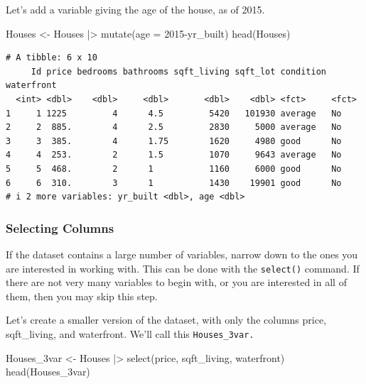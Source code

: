 \documentclass[
  letterpaper,
  DIV=11,
  numbers=noendperiod]{scrreprt}
\newenvironment{Shaded}{\begin{snugshade}}{\end{snugshade}}
\newcommand{\AttributeTok}[1]{\textcolor[rgb]{0.40,0.45,0.13}{#1}}
\newcommand{\DecValTok}[1]{\textcolor[rgb]{0.68,0.00,0.00}{#1}}
\newcommand{\FunctionTok}[1]{\textcolor[rgb]{0.28,0.35,0.67}{#1}}
\newcommand{\NormalTok}[1]{\textcolor[rgb]{0.00,0.23,0.31}{#1}}
\newcommand{\OtherTok}[1]{\textcolor[rgb]{0.00,0.23,0.31}{#1}}
\newcommand{\SpecialCharTok}[1]{\textcolor[rgb]{0.37,0.37,0.37}{#1}}
\begin{document}
Let's add a variable giving the age of the house, as of 2015.

\begin{Shaded}
\begin{Highlighting}[]
\NormalTok{Houses }\OtherTok{\textless{}{-}}\NormalTok{ Houses }\SpecialCharTok{|\textgreater{}} \FunctionTok{mutate}\NormalTok{(}\AttributeTok{age =} \DecValTok{2015}\SpecialCharTok{{-}}\NormalTok{yr\_built)}
\FunctionTok{head}\NormalTok{(Houses)}
\end{Highlighting}
\end{Shaded}

\begin{verbatim}
# A tibble: 6 x 10
     Id price bedrooms bathrooms sqft_living sqft_lot condition waterfront
  <int> <dbl>    <dbl>     <dbl>       <dbl>    <dbl> <fct>     <fct>     
1     1 1225         4      4.5         5420   101930 average   No        
2     2  885.        4      2.5         2830     5000 average   No        
3     3  385.        4      1.75        1620     4980 good      No        
4     4  253.        2      1.5         1070     9643 average   No        
5     5  468.        2      1           1160     6000 good      No        
6     6  310.        3      1           1430    19901 good      No        
# i 2 more variables: yr_built <dbl>, age <dbl>
\end{verbatim}

\subsubsection*{Selecting Columns}\label{selecting-columns}

If the dataset contains a large number of variables, narrow down to the
ones you are interested in working with. This can be done with the
\texttt{select()} command. If there are not very many variables to begin
with, or you are interested in all of them, then you may skip this step.

Let's create a smaller version of the dataset, with only the columns
price, sqft\_living, and waterfront. We'll call this
\texttt{Houses\_3var.}

\begin{Shaded}
\begin{Highlighting}[]
\NormalTok{Houses\_3var }\OtherTok{\textless{}{-}}\NormalTok{ Houses }\SpecialCharTok{|\textgreater{}} \FunctionTok{select}\NormalTok{(price, sqft\_living, waterfront)}
\FunctionTok{head}\NormalTok{(Houses\_3var)}
\end{Highlighting}
\end{Shaded}
\end{document}
